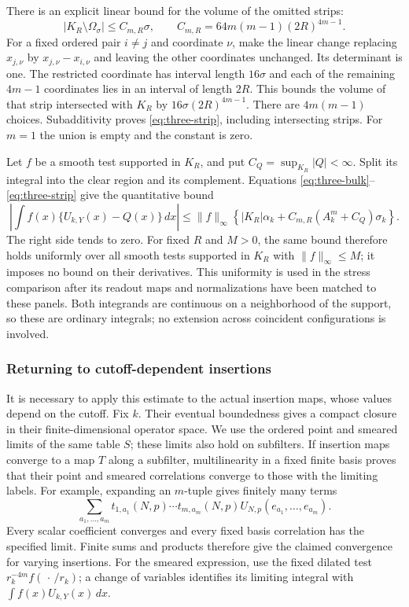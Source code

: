 There is an explicit linear bound for the volume of the omitted strips:
\begin{equation}\label{eq:three-strip}
 |K_R\setminus\Omega_\sigma|\le C_{m,R}\sigma,
 \qquad C_{m,R}=64m(m-1)(2R)^{4m-1}.
\end{equation}
For a fixed ordered pair $i\ne j$ and coordinate $\nu$, make the
linear change replacing $x_{j,\nu}$ by
$x_{j,\nu}-x_{i,\nu}$ and leaving the other coordinates unchanged.
Its determinant is one. The restricted coordinate has interval length
$16\sigma$ and each of the remaining $4m-1$ coordinates lies in an
interval of length $2R$. This bounds the volume of that strip intersected
with $K_R$ by $16\sigma(2R)^{4m-1}$. There are $4m(m-1)$ choices.
Subadditivity proves \eqref{eq:three-strip}, including intersecting strips.
For $m=1$ the union is empty and the constant is zero.

Let $f$ be a smooth test supported in $K_R$, and put
$C_Q=\sup_{K_R}|Q|<\infty$. Split its integral into the clear region
and its complement. Equations \eqref{eq:three-bulk}--\eqref{eq:three-strip}
give the quantitative bound
\begin{equation}\label{eq:three-integral}
 \left|\int f(x)\{U_{k,Y}(x)-Q(x)\}\,dx\right|
 \le\|f\|_\infty\left\{|K_R|\alpha_k+
                  C_{m,R}(A_k^m+C_Q)\sigma_k\right\}.
\end{equation}
The right side tends to zero. For fixed $R$ and $M>0$, the same bound
therefore holds uniformly over all smooth tests supported in $K_R$ with
$\|f\|_\infty\le M$; it imposes no bound on their derivatives. This
uniformity is used in the stress comparison after its readout maps and
normalizations have been matched to these panels. Both integrands are
continuous on a neighborhood of the support, so these are ordinary
integrals; no extension across coincident configurations is involved.

\subsubsection{Returning to cutoff-dependent insertions}

It is necessary to apply this estimate to the actual insertion maps, whose
values depend on the cutoff. Fix $k$. Their eventual boundedness gives a
compact closure in their finite-dimensional operator space. We use the
ordered point and smeared limits of the same table $S$; these limits also
hold on subfilters. If insertion maps converge to a map $T$ along a
subfilter, multilinearity in a fixed finite basis proves that their point
and smeared correlations converge to those with the limiting labels.
For example, expanding an $m$-tuple gives finitely many terms
\[
 \sum_{a_1,\ldots,a_m}
     t_{1,a_1}(N,p)\cdots t_{m,a_m}(N,p)
     U_{N,p}(e_{a_1},\ldots,e_{a_m}).
\]
Every scalar coefficient converges and every fixed basis correlation has
the specified limit. Finite sums and products therefore give the claimed
convergence for varying insertions. For the smeared expression, use the
fixed dilated test $r_k^{-4m}f(\,\cdot\,/r_k)$; a change of variables identifies
its limiting integral with $\int f(x)U_{k,Y}(x)\,dx$.

